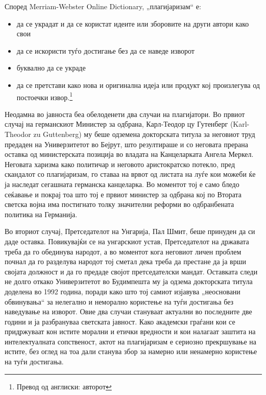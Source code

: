 \documentclass[12pt,a4paper]{article}
\begin{document}
\thispagestyle{empty}


Според Merriam-Webster Online Dictionary, „плагијаризам“ е: 
\begin{itemize}
  \renewcommand\labelitemi{--}
  \item да се украдат и да се користат идеите или зборовите на други автори како
  свои
  \item да се искористи туѓо достигање без да се наведе изворот
  \item буквално да се украде
  \item да се претстави како нова и оригинална идеја или продукт кој произлегува
  од постоечки извор.\footnote{Превод од англиски: авторот}
\end{itemize}

Неодамна во јавноста беа обелоденети два случаи на плагијатори. Во првиот случај
на германскиот Министер за одбрана, Карл-Теодор цу Гутенберг (Karl-Theodor zu
Guttenberg) му беше одземена докторската титула за неговиот труд предаден на
Универзитетот во Бејрут, што резултираше и со неговата прерана оставка од
министерската позиција во владата на Канцеларката Ангела Меркел. Неговата
харизма како политичар и неговото аристократско потекло, пред скандалот со
плагијаризам, го ставаа на врвот од листата на луѓе кои можеби ќе ја наследат
сегашната германска канцеларка. Во моментот тој е само бледо сеќавање и покрај
тоа што тој е првиот министер за одбрана кој по Втората светска војна има
постигнато толку значителни реформи во одбранбената политика на Германија.

Во вториот случај, Претседателот на Унгарија, Пал Шмит, беше принуден да си даде
оставка. Повикувајќи се на унгарскиот устав, Претседателот на државата треба да
го обединува народот, а во моментот кога неговиот личен проблем почнал да го
разделува народот тој сметал дека треба да престане да ја врши својата должност
и да го предаде својот претседателски мандат. Оставката следи не долго откако
Универзитетот во Будимпешта му ја одзема докторската титула доделена во 1992
година, поради како што тој самиот изјавува „неосновани обвинувања“ за нелегално
и неморално користење на туѓи достигања без наведување на изворот. Овие два
случаи стануваат актуални во последните две години и ја разбрануваа светската
јавност. Како академски граѓани кои се придржуваат кон истите морални и етички
вредности и кои налагаат заштита на интелектуалната сопственост, актот на
плагијаризам е сериозно прекршување на истите, без оглед на тоа дали станува
збор за намерно или ненамерно користење на туѓи достигања.
\end{document}
